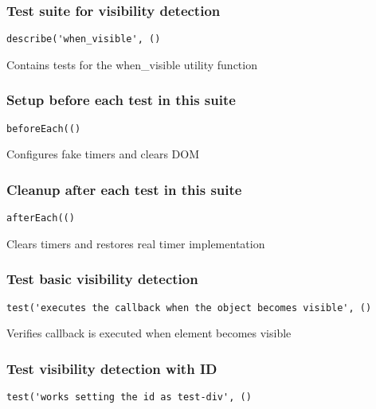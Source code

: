 \documentclass[a4paper]{article}
\begin{document}
\hypertarget{toc492}{}
\subsubsection{Test suite for visibility detection}

\begin{lstlisting}
describe('when_visible', ()
\end{lstlisting}

Contains tests for the when\_visible utility function

\hypertarget{toc493}{}
\subsubsection{Setup before each test in this suite}

\begin{lstlisting}
beforeEach(()
\end{lstlisting}

Configures fake timers and clears DOM

\hypertarget{toc494}{}
\subsubsection{Cleanup after each test in this suite}

\begin{lstlisting}
afterEach(()
\end{lstlisting}

Clears timers and restores real timer implementation

\hypertarget{toc495}{}
\subsubsection{Test basic visibility detection}

\begin{lstlisting}
test('executes the callback when the object becomes visible', ()
\end{lstlisting}

Verifies callback is executed when element becomes visible

\hypertarget{toc496}{}
\subsubsection{Test visibility detection with ID}

\begin{lstlisting}
test('works setting the id as test-div', ()
\end{lstlisting}
\end{document}
